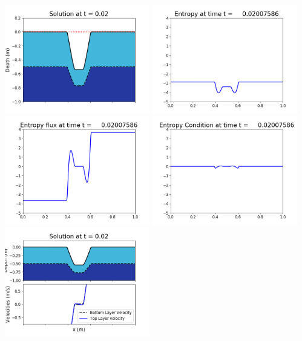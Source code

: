 \documentclass[11pt]{article}
\begin{document}
\includegraphics[width=0.475\textwidth]{frame0058fig1006.png}
\vskip 10pt 
\includegraphics[width=0.475\textwidth]{frame0058fig1007.png}
\includegraphics[width=0.475\textwidth]{frame0058fig1008.png}
\vskip 10pt 
\includegraphics[width=0.475\textwidth]{frame0058fig1009.png}
\vskip 10pt 
\includegraphics[width=0.475\textwidth]{frame0059fig1001.png}
\end{document}
